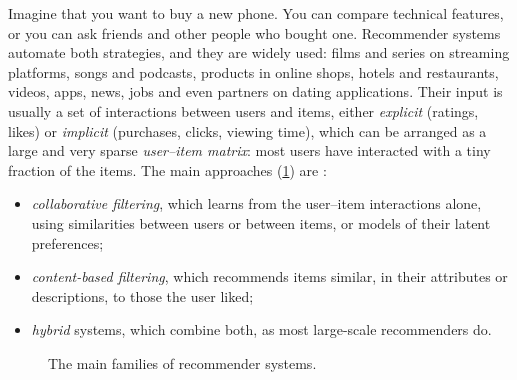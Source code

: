 Imagine that you want to buy a new phone. You can compare technical features, or you can ask friends and
other people who bought one. Recommender systems automate both strategies, and they are widely used: films
and series on streaming platforms, songs and podcasts, products in online shops, hotels and restaurants,
videos, apps, news, jobs and even partners on dating applications. Their input is usually a set of
interactions between users and items, either \emph{explicit} (ratings, likes) or \emph{implicit} (purchases,
clicks, viewing time), which can be arranged as a large and very sparse \emph{user--item matrix}: most users
have interacted with a tiny fraction of the items. The main approaches (\cref{fig:rectaxonomy}) are
\citep{aggarwal2016recommender,ricci2022recommender}:
\begin{itemize}
  \item \emph{collaborative filtering}, which learns from the user--item interactions alone, using
        similarities between users or between items, or models of their latent preferences;
  \item \emph{content-based filtering}, which recommends items similar, in their attributes or descriptions, to
        those the user liked;
  \item \emph{hybrid} systems, which combine both, as most large-scale recommenders do.
\end{itemize}

\begin{figure}[htbp]
\centering
{}
\caption{The main families of recommender systems.}
\label{fig:rectaxonomy}
\end{figure}

